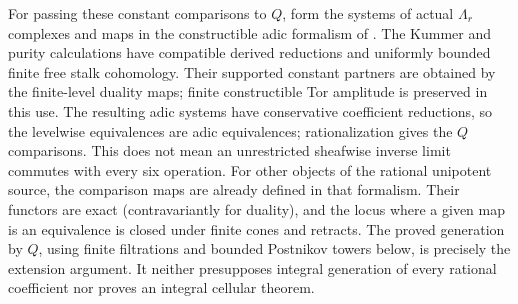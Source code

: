 \documentclass[11pt]{article}
\theoremstyle{definition}
\theoremstyle{remark}
\begin{document}
For passing these constant comparisons to $Q$, form the systems of
actual $\Lambda_r$ complexes and maps in the constructible adic
formalism of \cite{LOAdic,LZEnhanced}.  The Kummer and purity
calculations have compatible derived reductions and uniformly bounded
finite free stalk cohomology.  Their supported constant partners are
obtained by the finite-level duality maps; finite constructible Tor
amplitude is preserved in this use.  The resulting adic systems have
conservative coefficient reductions, so the levelwise equivalences
are adic equivalences; rationalization gives the $Q$ comparisons.
This does not mean an unrestricted sheafwise inverse limit commutes
with every six operation.  For other objects of the rational
unipotent source, the comparison maps are already defined in that
formalism.  Their functors are exact (contravariantly for duality),
and the locus where a given map is an equivalence is closed under
finite cones and retracts.  The proved generation by $Q$, using
finite filtrations and bounded Postnikov towers below, is precisely
the extension argument.  It neither presupposes integral generation
of every rational coefficient nor proves an integral cellular theorem.
\end{document}
